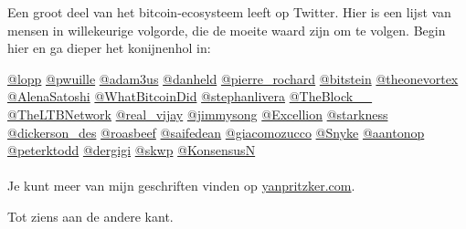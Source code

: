 \noindent Een groot deel van het bitcoin-ecosysteem leeft op Twitter. Hier is een lijst van mensen in willekeurige volgorde, die de moeite waard zijn om te volgen. Begin hier en ga dieper het konijnenhol in:

\href{https://twitter.com/lopp}{@lopp}
\href{https://twitter.com/pwuille}{@pwuille}
\href{https://twitter.com/adam3us}{@adam3us}
\href{https://twitter.com/danheld}{@danheld}
\href{https://twitter.com/pierre\_rochard}{@pierre\_rochard}
\href{https://twitter.com/bitstein}{@bitstein}
\href{https://twitter.com/theonevortex}{@theonevortex}
\href{https://twitter.com/AlenaSatoshi}{@AlenaSatoshi}
\href{https://twitter.com/WhatBitcoinDid}{@WhatBitcoinDid}
\href{https://twitter.com/stephanlivera}{@stephanlivera}
\href{https://twitter.com/TheBlock\_\_}{@TheBlock\_\_}
\href{https://twitter.com/TheLTBNetwork}{@TheLTBNetwork}
\href{https://twitter.com/real\_vijay}{@real\_vijay}
\href{https://twitter.com/jimmysong}{@jimmysong}
\href{https://twitter.com/Excellion}{@Excellion}
\href{https://twitter.com/starkness}{@starkness}
\href{https://twitter.com/dickerson\_des}{@dickerson\_des}
\href{https://twitter.com/roasbeef}{@roasbeef}
\href{https://twitter.com/saifedean}{@saifedean}
\href{https://twitter.com/giacomozucco}{@giacomozucco}
\href{https://twitter.com/Snyke}{@Snyke}
\href{https://twitter.com/aantonop}{@aantonop}
\href{https://twitter.com/peterktodd}{@peterktodd}
\href{https://twitter.com/dergigi}{@dergigi}
\href{https://twitter.com/skwp}{@skwp}
\href{https://twitter.com/konsensusn}{@KonsensusN}
\paragraph{}


\noindent Je kunt meer van mijn geschriften vinden op  \href{https://yanpritzker.com}{yanpritzker.com}.

\noindent Tot ziens aan de andere kant.

